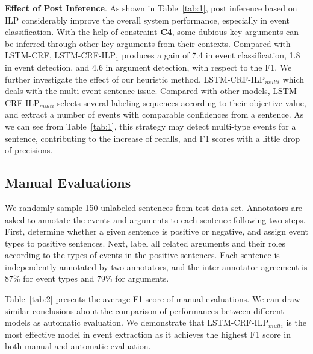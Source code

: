 \documentclass{article}
\begin{document}
\vspace{1em}
\noindent \textbf{Effect of Post Inference}. As shown in Table~\ref{tab:1}, post inference based on ILP considerably improve the overall system performance, especially in event classification. With the help of constraint \textbf{C4},  some dubious key arguments can be inferred through other key arguments from their contexts. Compared with LSTM-CRF, LSTM-CRF-ILP$_1$ produces a gain of 7.4 in event classification, 1.8 in event detection, and 4.6 in argument detection, with respect to the F1. We further investigate the effect of our heuristic method, LSTM-CRF-ILP$_{multi}$ which deals with the multi-event sentence issue. Compared with other models, LSTM-CRF-ILP$_{multi}$ selects several labeling sequences according to their objective value, and extract a number of events with comparable confidences from a sentence. As we can see from Table~\ref{tab:1}, this strategy may detect multi-type events for a sentence, contributing to the increase of recalls, and F1 scores with a little drop of precisions. 

\subsection{Manual Evaluations}
We randomly sample 150 unlabeled sentences from test data set. Annotators are asked to annotate the events and arguments to each sentence following two steps. First, determine whether a given sentence is positive or negative, and assign event types to positive sentences. Next, label all related arguments and their roles according to the types of events in the positive sentences. Each sentence is independently annotated by two annotators, and the inter-annotator agreement is 87\% for event types and 79\% for arguments.

Table~\ref{tab:2} presents the average F1 score of manual evaluations. We can draw similar conclusions about the comparison of performances between different models as automatic evaluation. We demonstrate that LSTM-CRF-ILP$_{multi}$ is the most effective model in event extraction as it achieves the highest F1 score in both manual and automatic evaluation.
\end{document}
